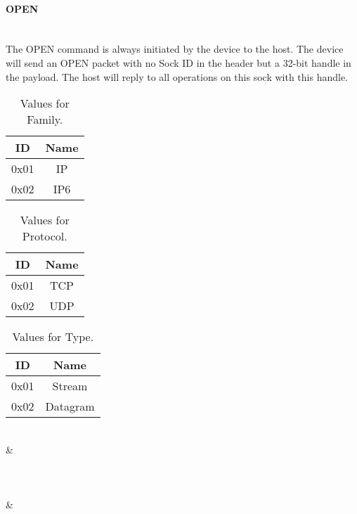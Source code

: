 \documentclass[10pt]{article}
\begin{document}
	\paragraph{OPEN} \mbox{}\\
	The OPEN command is always initiated by the device to the host. The device will send an OPEN packet with no Sock ID in the header but a 32-bit handle in the payload. The host will reply to all operations on this sock with this handle. \\
	\begin{table}[H]
		\begin{center}
			\caption{Values for Family.}
			\label{tab:table2}
			\begin{tabular}{c|c} 
				\rowcolor{lightgray}
				\textbf{ID} &	\textbf{Name}\\
				\hline
				0x01 & IP\\
				0x02 & IP6\\
			\end{tabular}
		\end{center}
	\end{table} 
	\begin{table}[H]
	\begin{center}
		\caption{Values for Protocol.}
		\label{tab:table3}
		\begin{tabular}{c|c} 
			\rowcolor{lightgray}
			\textbf{ID} &	\textbf{Name}\\
			\hline
			0x01 & TCP\\
			0x02 & UDP\\
		\end{tabular}
	\end{center}
	\end{table}
	\begin{table}[H]
	\begin{center}
		\caption{Values for Type.}
		\label{tab:table4}
		\begin{tabular}{c|c} 
			\rowcolor{lightgray}
			\textbf{ID} &	\textbf{Name}\\
			\hline
			0x01 & Stream\\
			0x02 & Datagram\\
		\end{tabular}
	\end{center}
	\end{table}
	\begin{bytefield}[bitwidth=1.7em]{32}
		 \\
			 &
			 \\
			 \\
			 \\
			 \\
			 &
			 \\
			 \\
	\end{bytefield}\\
\end{document}

